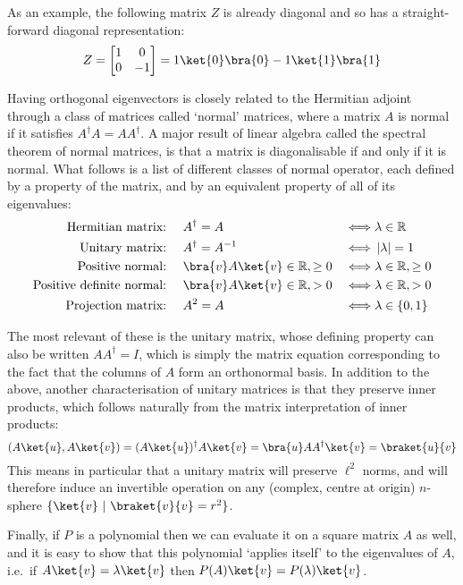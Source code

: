 As an example, the following matrix $Z$ is already diagonal and so has a straight-forward diagonal representation:
\begin{align*}
	Z = \left[\begin{matrix}
		1&0\\
		0&-1
	\end{matrix}\right] = 1\ket{0}\bra{0} - 1\ket{1}\bra{1}
\end{align*}

Having orthogonal eigenvectors is closely related to the Hermitian adjoint through a class of matrices called `normal' matrices, where a matrix $A$ is normal if it satisfies $A^\dagger A = AA^\dagger$. A major result of linear algebra called the spectral theorem of normal matrices, is that a matrix is diagonalisable if and only if it is normal. What follows is a list of different classes of normal operator, each defined by a property of the matrix, and by an equivalent property of all of its eigenvalues:
\begin{align*}
	\text{Hermitian matrix:\ }&&& A^\dagger = A & \iff& \lambda \in \mathbb{R} \\
	\text{Unitary matrix:\ }&&& A^\dagger = A^{-1} & \iff& \ord{\lambda}=1 \\
	\text{Positive normal:\ }&&& \bra{v}A\ket{v} \in \mathbb{R}, \geq 0 & \iff& \lambda \in \mathbb{R}, \geq 0 \\
	\text{Positive definite normal:\ }&&& \bra{v}A\ket{v} \in \mathbb{R}, > 0 & \iff& \lambda \in \mathbb{R}, > 0 \\
	\text{Projection matrix:\ }&&& A^2 = A & \iff& \lambda \in \{0, 1\} \\
\end{align*}

The most relevant of these is the unitary matrix, whose defining property can also be written $AA^\dagger = I$, which is simply the matrix equation corresponding to the fact that the columns of $A$ form an orthonormal basis. In addition to the above, another characterisation of unitary matrices is that they preserve inner products, which follows naturally from the matrix interpretation of inner products:
\[(A\ket{u}, A\ket{v}) = (A\ket{u})^\dagger A\ket{v} = \bra{u}AA^\dagger \ket{v} = \braket{u}{v}\]
This means in particular that a unitary matrix will preserve $\ell^2$ norms, and will therefore induce an invertible operation on any (complex, centre at origin) $n$-sphere $\{\ket{v}\ |\ \braket{v}{v} = r^2\}$.

Finally, if $P$ is a polynomial then we can evaluate it on a square matrix $A$ as well, and it is easy to show that this polynomial `applies itself' to the eigenvalues of $A$, i.e.\ if $A\ket{v} = \lambda\ket{v}$ then $P(A)\ket{v} = P(\lambda)\ket{v}$.

